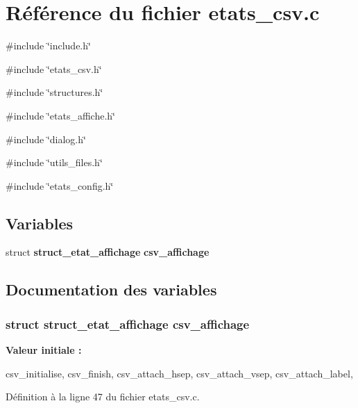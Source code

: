 \section{Référence du fichier etats\_\-csv.c}
\label{etats__csv_8c}
{\ttfamily \#include \char`\"{}include.h\char`\"{}}\par
{\ttfamily \#include \char`\"{}etats\_\-csv.h\char`\"{}}\par
{\ttfamily \#include \char`\"{}structures.h\char`\"{}}\par
{\ttfamily \#include \char`\"{}etats\_\-affiche.h\char`\"{}}\par
{\ttfamily \#include \char`\"{}dialog.h\char`\"{}}\par
{\ttfamily \#include \char`\"{}utils\_\-files.h\char`\"{}}\par
{\ttfamily \#include \char`\"{}etats\_\-config.h\char`\"{}}\par
\subsection*{Variables}
\begin{DoxyCompactItemize}
\item 
struct {\bf struct\_\-etat\_\-affichage} {\bf csv\_\-affichage}
\end{DoxyCompactItemize}


\subsection{Documentation des variables}
\subsubsection[{csv\_\-affichage}]{\setlength{\rightskip}{0pt plus 5cm}struct {\bf struct\_\-etat\_\-affichage} {\bf csv\_\-affichage}}\label{etats__csv_8c_a121b891fb05ffbd94cb74962dd89abd9}
{\bfseries Valeur initiale :}
\begin{DoxyCode}
 {
    csv_initialise,
    csv_finish,
    csv_attach_hsep,
    csv_attach_vsep,
    csv_attach_label,
}
\end{DoxyCode}


Définition à la ligne 47 du fichier etats\_\-csv.c.

